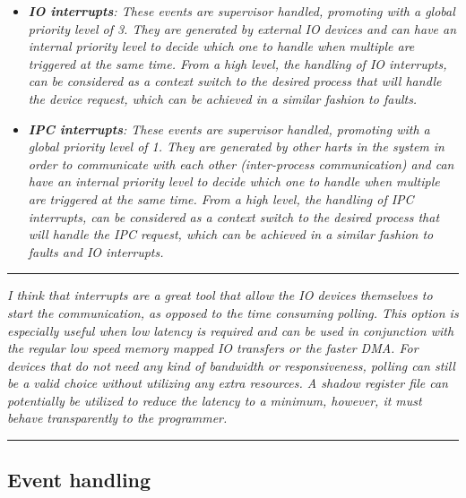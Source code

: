         \begin{itemize}

            \item \textit{\textbf{IO interrupts}: These events are supervisor handled, promoting with a global priority level of 3. They are generated by external IO devices and can have an internal priority level to decide which one to handle when multiple are triggered at the same time. From a high level, the handling of IO interrupts, can be considered as a context switch to the desired process that will handle the device request, which can be achieved in a similar fashion to faults.}

            \item \textit{\textbf{IPC interrupts}: These events are supervisor handled, promoting with a global priority level of 1. They are generated by other harts in the system in order to communicate with each other (inter-process communication) and can have an internal priority level to decide which one to handle when multiple are triggered at the same time. From a high level, the handling of IPC interrupts, can be considered as a context switch to the desired process that will handle the IPC request, which can be achieved in a similar fashion to faults and IO interrupts.}

        \end{itemize}

    \par\noindent\rule{\textwidth}{0.4pt}
    \textit{I think that interrupts are a great tool that allow the IO devices themselves to start the communication, as opposed to the time consuming polling. This option is especially useful when low latency is required and can be used in conjunction with the regular low speed memory mapped IO transfers or the faster DMA. For devices that do not need any kind of bandwidth or responsiveness, polling can still be a valid choice without utilizing any extra resources. A shadow register file can potentially be utilized to reduce the latency to a minimum, however, it must behave transparently to the programmer.}
    \par\noindent\rule{\textwidth}{0.4pt}

    \subsection{Event handling}

        \vspace{10pt}

